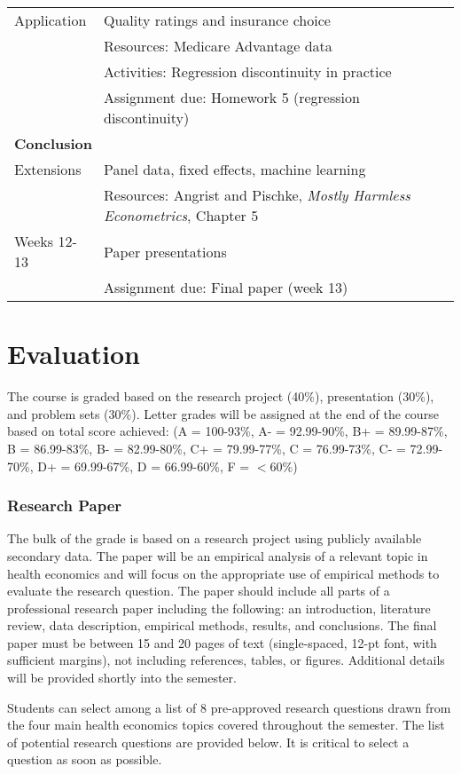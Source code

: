 \documentclass{article}
\begin{document}
\begin{longtable}{lp{13cm}}
  \hline
  Application & Quality ratings and insurance choice \\
              & Resources: Medicare Advantage data \\
              & Activities: Regression discontinuity in practice \citep{darden2015} \\
              & Assignment due: Homework 5 (regression discontinuity) \\
  \hline
  \multicolumn{2}{l}{\textbf{Conclusion}} \\
  \hline\hline
  Extensions & Panel data, fixed effects, machine learning \\
             & Resources:  Angrist and Pischke, \textit{Mostly Harmless Econometrics}, Chapter 5 \\
  \hline
  Weeks 12-13 & Paper presentations \\
              & Assignment due: Final paper (week 13)
\end{longtable}


\section*{Evaluation}
The course is graded based on the research project (40\%), presentation (30\%), and problem sets (30\%). Letter grades will be assigned at the end of the course based on total score achieved:
(A = 100-93\%, A- = 92.99-90\%, B+ = 89.99-87\%, B = 86.99-83\%, B- = 82.99-80\%, C+ = 79.99-77\%, C = 76.99-73\%, C- = 72.99-70\%, D+ = 69.99-67\%, D = 66.99-60\%, F = $<$60\%)


\subsubsection*{Research Paper}
The bulk of the grade is based on a research project using publicly available secondary data. The paper will be an empirical analysis of a relevant topic in health economics and will focus on the appropriate use of empirical methods to evaluate the research question. The paper should include all parts of a professional research paper including the following:  an introduction, literature review, data description, empirical methods, results, and conclusions. The final paper must be between 15 and 20 pages of text (single-spaced, 12-pt font, with sufficient margins), not including references, tables, or figures. Additional details will be provided shortly into the semester.

Students can select among a list of 8 pre-approved research questions drawn from the four main health economics topics covered throughout the semester. The list of potential research questions are provided below. It is critical to select a question as soon as possible.
\end{document}
